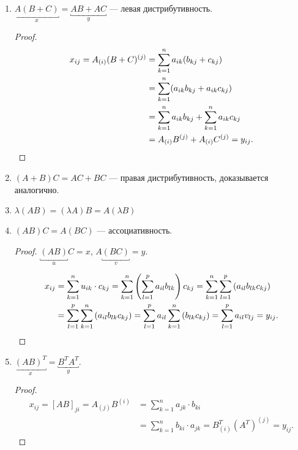 \begin{enumerate}
\item 
    $\underbracket{A(B + C)}_x = \underbracket{AB + AC}_y$ --- левая дистрибутивность.
   
    \begin{proof}
        \begin{align*}
            x_{ij} = A_{(i)} (B + C)^{(j)}
            &= \sum_{k = 1}^{n} a_{ik} (b_{kj} + c_{kj}) \\
            &= \sum_{k = 1}^{n} (a_{ik} b_{kj} + a_{ik} c_{kj}) \\
            &= \sum_{k = 1}^{n} a_{ik} b_{kj} + \sum_{k = 1}^{n} a_{ik} c_{kj} \\
            &= A_{(i)} B^{(j)} + A_{(i)} C^{(j)} = y_{ij}
        .\qedhere\end{align*}
    \end{proof}

\item $(A+B)C = AC + BC$ --- правая дистрибутивность, доказывается аналогично.

\item $\lambda(AB) = (\lambda A) B = A (\lambda B)$

\item $(AB)C = A(BC)$ --- ассоциативность.

    \begin{proof}
        $\underbracket{(AB)}_u C = x$, $A\underbracket{(BC)}_v = y$.

        \begin{align*}
            x_{ij}
            &= \sum_{k = 1}^{n} u_{ik} \cdot c_{kj}
            = \sum_{k = 1}^{n} \left(\sum_{l = 1}^{p} a_{il} b_{lk}\right) c_{kj}
            = \sum_{k = 1}^{n} \sum_{l = 1}^{p} \left(a_{il} b_{lk} c_{kj}\right) \\
            &= \sum_{l = 1}^{p} \sum_{k = 1}^{n} \left(a_{il} b_{lk} c_{kj}\right)
            = \sum_{l = 1}^{p} a_{il} \sum_{k = 1}^{n} \left(b_{lk} c_{kj}\right)
            = \sum_{l = 1}^{p} a_{il} v_{lj} = y_{ij}
        .\qedhere\end{align*}
    \end{proof}

\item 
    $\underbracket{(AB)^T}_x = \underbracket{B^T A^T}_y$.
   
    \begin{proof}
        \begin{align*}
            x_{ij} = [AB]_{ji} = A_{(j)} B^{(i)}
            &= \sum_{k = 1}^n a_{jk} \cdot b_{ki} \\
            &= \sum_{k = 1}^{n} b_{ki} \cdot a_{jk} = B^T_{(i)} (A^T)^{(j)} = y_{ij}
        .\end{align*}
    \end{proof}
\end{enumerate}

